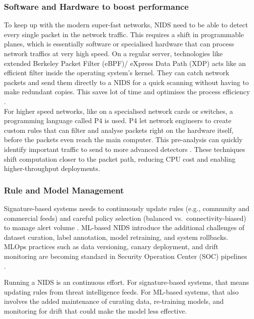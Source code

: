 \subsubsection{Software and Hardware to boost performance}
To keep up with the modern super-fast networks, NIDS need to be able to detect every single packet in the network traffic. This requires a shift in programmable planes, which is essentially software or specialised hardware that can process network traffics at very high speed. On a regular server, technologies like extended Berkeley Packet Filter (eBPF)/ eXpress Data Path (XDP) acts like an efficient filter inside the operating system's kernel. They can catch network packets and send them directly to a NIDS for a quick scanning without having to make redundant copies. This saves lot of time and optimises the process efficiency \parencite{NSDI2023Electrode,ASPLOS2023eHDL}.\\
\noindent For higher speed networks, like on a specialised network cards or switches, a programming language called P4 is used. P4 let network engineers to create custom rules that can filter and analyse packets right on the hardware itself, before the packets even reach the main computer. This pre-analysis can quickly identify important traffic to send to more advanced detectors \parencite{P4NIDS2024}. These techniques shift computation closer to the packet path, reducing CPU cost and enabling higher-throughput deployments.

\subsubsection{Rule and Model Management} 
Signature-based systems needs to continuously update rules (e.g., community and commercial feeds) and careful policy selection (balanced vs.\ connectivity-biased) to manage alert volume \parencite{CiscoSnort3Guide2024,SuricataDocs2025}. ML-based NIDS introduce the additional challenges of dataset curation, label annotation, model retraining, and system rollbacks. MLOps practices such as data versioning, canary deployment, and drift monitoring are becoming standard in Security Operation Center (SOC) pipelines \parencite{ACM2024DLIDSReview,Cerasuolo2025Adaptable}.

Running a NIDS is an continuous effort. For signature-based systems, that means updating rules from threat intelligence feeds. For ML-based systems, that also involves the added maintenance of curating data, re-training models, and monitoring for drift that could make the model less effective.

